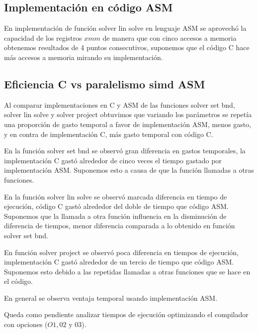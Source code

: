 
\subsection{Implementación en código ASM}
\par En implementación de función solver lin solve en lenguaje ASM se aprovechó la capacidad de los registros $xmm$ de manera que con cinco accesos a memoria obtenemos resultados de 4 puntos consecutivos, suponemos que el código C hace más accesos a memoria mirando su implementación. 

\subsection{Eficiencia C vs paralelismo simd ASM}
Al comparar implementaciones en C y ASM de las funciones solver set bnd, solver lin solve y solver project obtuvimos que variando los parámetros se repetía una proporción de gasto temporal a favor de implementación ASM, menos gasto, y en contra de implementación C, más gasto temporal con código C. 
\par En la función solver set bnd se observó gran diferencia en gastos temporales, la implementación C gastó alrededor de cinco veces el tiempo gastado por implementación ASM. Suponemos esto a causa de que la función llamadas a otras funciones.
\par En la función solver lin solve se observó marcada diferencia en tiempo de ejecución, código C gastó alrededor del doble de tiempo que código ASM. Suponemos que la llamada a otra función influencia en la disminución de diferencia de tiempos, menor diferencia comparada a lo obtenido en función solver set bnd.
\par En función solver project se observó poca diferencia en tiempos de ejecución, implementación C gastó alrededor de un tercio de tiempo que código ASM. Suponemos esto debido a las repetidas llamadas a otras funciones que se hace en el código.
\par En general se observa ventaja temporal usando implementación ASM.

Queda como pendiente analizar tiempos de ejecución optimizando el compilador con opciones ($O1, 02$ y $03$).
